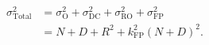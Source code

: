 \begin{colsection}
\begin{colsection}
\begin{equation}
    \begin{split}
        \sigma_\text{Total}^2 & = \sigma_\text{O}^2 +
                                  \sigma_\text{DC}^2 +
                                  \sigma_\text{RO}^2 +
                                  \sigma_\text{FP}^2 \\
                              & = N + D + R^2 + k_\text{FP}^2{(N+D)}^2.
    \end{split}
    \label{eq:noise}
\end{equation}

\end{colsection}


\end{colsection}


\newpage
